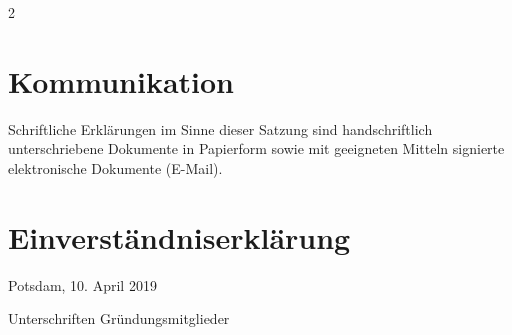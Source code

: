 \documentclass[a4paper, 10pt, headings=normal]{scrartcl}
\newenvironment{textinput}[1]%
{%
	\par%
	\vspace{0.75mm}%
	\noindent%
	\linespread{1}%
	\begin{tcolorbox}[colback=light-gray, sharp corners=all, boxrule=0pt, colframe=light-gray, left=1mm, top=0.3mm, bottom=-0.3mm, right=1mm, width=#1]
		\begin{minipage}[t]{\linewidth}%
			\textinputfont\strut%
}%
{%
			\strut%
		\end{minipage}%
	\end{tcolorbox}
	\vspace{0.75mm}%
}
\begin{document}
\begin{multicols}{2}
\section{Kommunikation}
\label{par:kommunikation}

Schriftliche Erklärungen im Sinne dieser Satzung sind handschriftlich unterschriebene Dokumente in Papierform sowie mit geeigneten Mitteln signierte elektronische Dokumente (E-Mail).

\end{multicols}

\section*{Einverständniserklärung}

Potsdam, 10. April 2019

\bigskip

\begin{textinput}{\linewidth}%
	Unterschriften Gründungsmitglieder
	\vspace{100mm}%
\end{textinput}%
\end{document}
